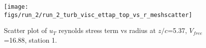 \begin{figure}[H]
\centering
\texttt{[image: figs/run\_2/run\_2\_turb\_visc\_ettap\_top\_vs\_r\_meshscatter]}
\caption{Scatter plot of $
u_T$ reynolds stress term vs radius at $z/c$=5.37, $V_{free}$=16.88, station 1.}
\label{fig:run_2_turb_visc_ettap_top_vs_r_meshscatter}
\end{figure}


